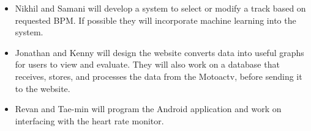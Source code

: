 \documentclass[letterpaper,english]{scrreprt}
\begin{document}
\begin{itemize}
	\item Nikhil and Samani will develop a system to select or modify a track based on requested BPM. If possible they will incorporate machine learning into the system.
	\item Jonathan and Kenny will design the website converts data into useful graphs for users to view and evaluate. They will also work on a database that receives, stores, and processes the data from the Motoactv, before sending it to the website.
	\item Revan and Tae-min will program the Android application and work on interfacing with the heart rate monitor.
\end{itemize}
\end{document}

